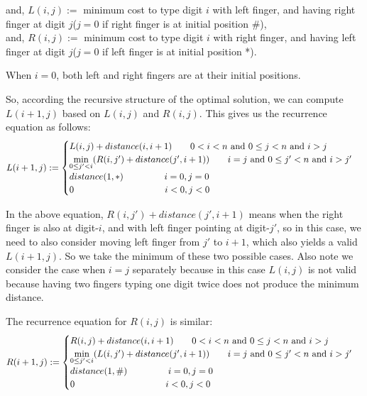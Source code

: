 \documentclass[11pt]{article}
\begin{document}
\begin{enumerate}
  and, $L(i,j) := $ minimum cost to type digit $i$ with left finger,
  and having right finger at digit $j$($j=0$ if right finger is at
  initial position \#),\\
  and, $R(i,j) := $ minimum cost to type digit $i$ with right finger,
  and having left finger at digit $j$($j=0$ if left finger is at
  initial position *).

  When $i=0$, both left and right fingers are at their initial positions.

  So, according the recursive structure of the optimal solution, we
  can compute $L(i+1, j)$ based on $L(i,j)$ and $R(i,j)$. This gives
  us the recurrence equation as follows:
  \begin{equation}
    L(i+1,j) := \begin{cases}
      L(i,j) + distance(i,i+1) \-\hspace{2em} 0 < i < n \text{ and
      } 0 \leq j < n \text{ and } i > j \\ 
      \min\limits_{0 \leq j' < i}(R(i,j') + distance(j',i+1)) \-\hspace{2em} i = j \text{ and }
      0 \leq j' < n \text{ and } i > j' \\
      distance(1, *) \-\hspace{4.5em} i = 0, j = 0\\
      0 \-\hspace{10em} i < 0, j < 0
    \end{cases}
  \end{equation}

  In the above equation, $R(i,j') + distance(j',i+1)$ means when the
  right finger is also at digit-$i$, and with left finger pointing at
  digit-$j'$, so in this case, we need to also consider moving left
  finger from $j'$ to $i+1$, which also yields a valid $L(i+1,j)$. So
  we take the minimum of these two possible cases. Also note we
  consider the case when $i=j$ separately because in this case
  $L(i,j)$ is not valid because having two fingers typing one digit
  twice does not produce the minimum distance.

  The recurrence equation for $R(i,j)$ is similar:
  \begin{equation}
    R(i+1,j) := \begin{cases}
      R(i,j) + distance(i,i+1) \-\hspace{2em} 0 < i < n \text{ and } 0 \leq j < n
      \text{ and } i > j \\ 
      \min\limits_{0 \leq j' < i}(L(i,j') + distance(j',i+1)) \-\hspace{2em} i = j \text{ and } 0
      \leq j' < n \text{ and } i > j'\\ 
      distance(1, \#) \-\hspace{4.5em} i = 0, j = 0\\
      0 \-\hspace{10em} i < 0, j < 0
    \end{cases}
  \end{equation}



\end{enumerate}
\end{document}
